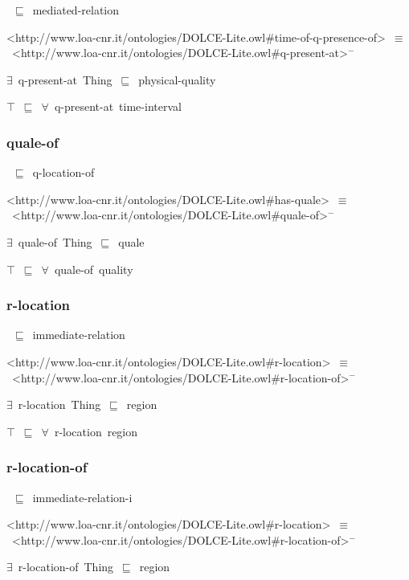 \documentclass{article}
\begin{document}
~\ensuremath{\sqsubseteq}~mediated-relation

<http://www.loa-cnr.it/ontologies/DOLCE-Lite.owl#time-of-q-presence-of>~\ensuremath{\equiv}~<http://www.loa-cnr.it/ontologies/DOLCE-Lite.owl#q-present-at>\ensuremath{^-}

\ensuremath{\exists}~q-present-at~Thing~\ensuremath{\sqsubseteq}~physical-quality

\ensuremath{\top}~\ensuremath{\sqsubseteq}~\ensuremath{\forall}~q-present-at~time-interval

\subsubsection*{quale-of}

~\ensuremath{\sqsubseteq}~q-location-of

<http://www.loa-cnr.it/ontologies/DOLCE-Lite.owl#has-quale>~\ensuremath{\equiv}~<http://www.loa-cnr.it/ontologies/DOLCE-Lite.owl#quale-of>\ensuremath{^-}

\ensuremath{\exists}~quale-of~Thing~\ensuremath{\sqsubseteq}~quale

\ensuremath{\top}~\ensuremath{\sqsubseteq}~\ensuremath{\forall}~quale-of~quality

\subsubsection*{r-location}

~\ensuremath{\sqsubseteq}~immediate-relation

<http://www.loa-cnr.it/ontologies/DOLCE-Lite.owl#r-location>~\ensuremath{\equiv}~<http://www.loa-cnr.it/ontologies/DOLCE-Lite.owl#r-location-of>\ensuremath{^-}

\ensuremath{\exists}~r-location~Thing~\ensuremath{\sqsubseteq}~region

\ensuremath{\top}~\ensuremath{\sqsubseteq}~\ensuremath{\forall}~r-location~region

\subsubsection*{r-location-of}

~\ensuremath{\sqsubseteq}~immediate-relation-i

<http://www.loa-cnr.it/ontologies/DOLCE-Lite.owl#r-location>~\ensuremath{\equiv}~<http://www.loa-cnr.it/ontologies/DOLCE-Lite.owl#r-location-of>\ensuremath{^-}

\ensuremath{\exists}~r-location-of~Thing~\ensuremath{\sqsubseteq}~region
\end{document}
